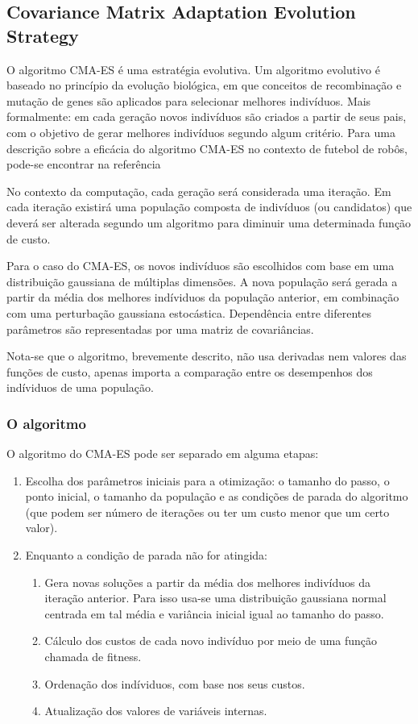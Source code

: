 \documentclass[10pt,fleqn,a4paper]{article}
\begin{document}
\subsection{Covariance Matrix Adaptation Evolution Strategy}

O algoritmo CMA-ES é uma estratégia evolutiva. Um algoritmo evolutivo é baseado no princípio da evolução biológica, em que conceitos de recombinação e mutação de genes são aplicados para selecionar melhores indivíduos. Mais formalmente: em cada geração novos indivíduos são criados a partir de seus pais, com o objetivo de gerar melhores indivíduos segundo algum critério. Para uma descrição sobre a eficácia do algoritmo CMA-ES no contexto de futebol de robôs, pode-se encontrar na referência \cite{CMA-ES-Soccer}

No contexto da computação, cada geração será considerada uma iteração. Em cada iteração existirá uma população composta de indivíduos (ou candidatos) que deverá ser alterada segundo um algoritmo para diminuir uma determinada função de custo. 

Para o caso do CMA-ES, os novos indivíduos são escolhidos com base em uma distribuição gaussiana de múltiplas dimensões. A nova população será gerada a partir da média dos melhores indíviduos da população anterior, em combinação com uma perturbação gaussiana estocástica. Dependência entre diferentes parâmetros são representadas por uma matriz de covariâncias.

Nota-se que o algoritmo, brevemente descrito, não usa derivadas nem valores das funções de custo, apenas importa a comparação entre os desempenhos dos indíviduos de uma população.

\subsubsection{O algoritmo}

O algoritmo do CMA-ES pode ser separado em alguma etapas:

\begin{enumerate}
\item Escolha dos parâmetros iniciais para a otimização: o tamanho do passo, o ponto inicial, o tamanho da população e as condições de parada do algoritmo (que podem ser número de iterações ou ter um custo menor que um certo valor).
\item Enquanto a condição de parada não for atingida:
\begin{enumerate}
\item Gera novas soluções a partir da média dos melhores indivíduos da iteração anterior. Para isso usa-se uma distribuição gaussiana normal centrada em tal média e variância inicial igual ao tamanho do passo.
\item Cálculo dos custos de cada novo indivíduo por meio de uma função chamada de fitness.
\item Ordenação dos indíviduos, com base nos seus custos.
\item Atualização dos valores de variáveis internas.
\end{enumerate}
\end{enumerate}
\end{document}
